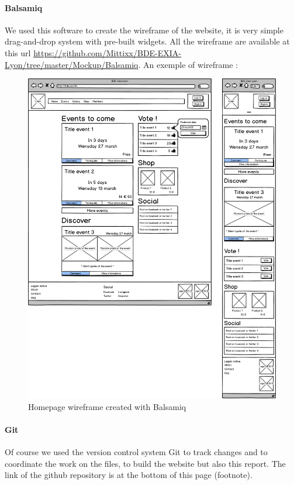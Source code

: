 			\paragraph{Balsamiq}
				We used this software to create the wireframe of the website, it is very simple drag-and-drop system with pre-built widgets. All the wireframe are available at this url \href{https://github.com/Mittixx/BDE-EXIA-Lyon/tree/master/Mockup/Balsamiq}{https://github.com/Mittixx/BDE-EXIA-Lyon/tree/master/Mockup/Balsamiq}. An exemple of wireframe : 	
				\begin{figure}[h]
					\centering
					\includegraphics[scale=0.25]{img/balsamiq-wireframe-home.png}
					\caption{Homepage wireframe created with Balsamiq}
				\end{figure}
				
			
			\paragraph{Git}
				Of course we used the version control system Git to track changes and to coordinate the work on the files, to build the website but also this report. The link of the github repository is at the bottom of this page (footnote).

